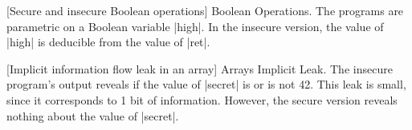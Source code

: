 \begin{center}
\captionsetup{type=lstlisting}
\begin{minipage}{.45\textwidth}
\begin{center}\end{center}
\end{minipage}\hfill%
\begin{minipage}{.45\textwidth}
\begin{center}\end{center}
\end{minipage}
[Secure and insecure Boolean operations]{
Boolean Operations. The programs are parametric on a Boolean variable \pr|high|.
In the insecure version, the value of \pr|high| is deducible from the value of \pr|ret|.
}\label{lst:bool-ops}
\end{center}

\begin{center}
\captionsetup{type=lstlisting}
\begin{minipage}{.45\textwidth}
\begin{center}\end{center}
\end{minipage}\hfill%
\begin{minipage}{.45\textwidth}
\begin{center}\end{center}
\end{minipage}
[Implicit information flow leak in an array]{
Arrays Implicit Leak. The insecure program's output reveals if the value of \pr|secret| is or is not 42.
This leak is small, since it corresponds to 1 bit of information.
However, the secure version reveals nothing about the value of \pr|secret|.}
\label{lst:ni-arrays}
\end{center}

